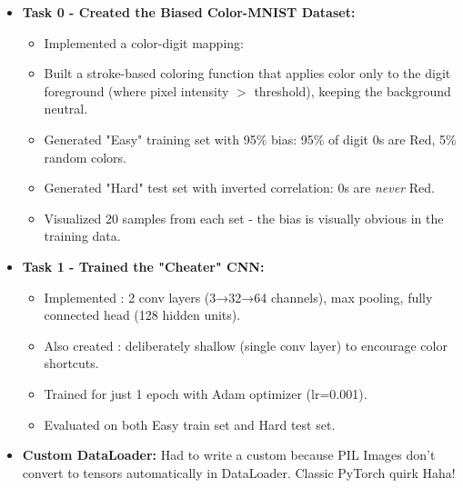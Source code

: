 \documentclass[9pt,a4paper,twocolumn,twoside]{tau-class/tau}
\begin{document}
        \begin{itemize}
            \item \textbf{Task 0 - Created the Biased Color-MNIST Dataset:}
            \begin{itemize}
                \item Implemented a color-digit mapping: 
                \begin{code}
                    
                    \caption{Color Mapping}
                    \label{lst:mapping}
                \end{code}
                \item Built a stroke-based coloring function that applies color only to the digit foreground (where pixel intensity $>$ threshold), keeping the background neutral.
                \item Generated "Easy" training set with 95\% bias: 95\% of digit 0s are Red, 5\% random colors.
                \item Generated "Hard" test set with inverted correlation: 0s are \textit{never} Red.
                \item Visualized 20 samples from each set - the bias is visually obvious in the training data.
            \end{itemize}
            
            \item \textbf{Task 1 - Trained the "Cheater" CNN:}
            \begin{itemize}
                \item Implemented : 2 conv layers (3→32→64 channels), max pooling, fully connected head (128 hidden units).
                \item Also created : deliberately shallow (single conv layer) to encourage color shortcuts.
                \item Trained  for just 1 epoch with Adam optimizer (lr=0.001).
                \item Evaluated on both Easy train set and Hard test set.
            \end{itemize}
            
            \item \textbf{Custom DataLoader:} Had to write a custom  because PIL Images don't convert to tensors automatically in DataLoader. Classic PyTorch quirk Haha!
        \end{itemize}
        
\end{document}
